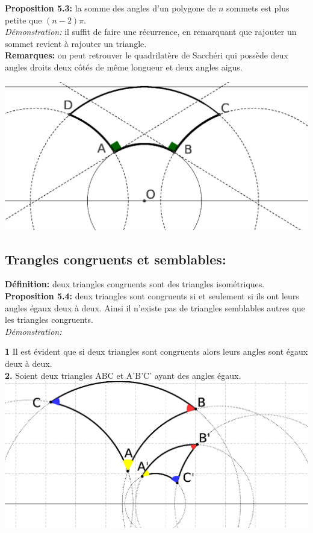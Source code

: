 \documentclass[a4paper, 12pt, twoside]{book}
\begin{document}
\textbf{Proposition 5.3:} la somme des angles d'un polygone de $n$ sommets est plus petite que $(n-2)\pi$.\\

\textit{Démonstration:} il suffit de faire une récurrence, en remarquant que rajouter un sommet revient à rajouter un triangle.\\

 \textbf{Remarques:} on peut retrouver le quadrilatère de Sacchéri qui possède deux angles droits deux côtés de même longueur et deux angles aigus.\
 

 
  
\includegraphics[scale=0.7]{figures/hyper13.eps}  

\subsection{Trangles congruents et semblables:}

 \textbf{Définition:} deux triangles congruents sont des triangles isométriques.\\
 
 \textbf{Proposition 5.4:} deux triangles sont congruents si et seulement si ils ont leurs angles égaux deux à deux. Ainsi il n'existe pas de triangles semblables autres que les triangles congruents.\\
 
 \textit{Démonstration:}\
 
 \textbf{1} Il est évident que si deux triangles sont congruents alors leurs angles sont égaux deux à deux.\\
 
 \textbf{2.} Soient deux triangles ABC et A'B'C' ayant des angles égaux.\\
 
 \includegraphics[scale=0.7]{figures/hyper111.eps} \\
 
\end{document}
